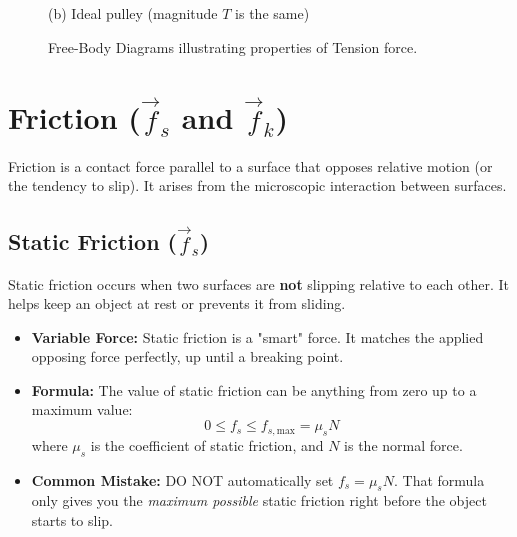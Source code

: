 \documentclass{article}
\begin{document}
\begin{figure}[h]
\begin{minipage}{0.45\textwidth}
        
        \vspace{0.2cm}
        \small (b) Ideal pulley (magnitude $T$ is the same)
    \end{minipage}
    
    \caption{Free-Body Diagrams illustrating properties of Tension force.}
\end{figure}


\newpage

\section{Friction ($\vec{f}_s$ and $\vec{f}_k$)}
Friction is a contact force parallel to a surface that opposes relative motion (or the tendency to slip). It arises from the microscopic interaction between surfaces.

\subsection{Static Friction ($\vec{f}_s$)}
Static friction occurs when two surfaces are \textbf{not} slipping relative to each other. It helps keep an object at rest or prevents it from sliding.
\begin{itemize}
    \item \textbf{Variable Force:} Static friction is a "smart" force. It matches the applied opposing force perfectly, up until a breaking point.
    \item \textbf{Formula:} The value of static friction can be anything from zero up to a maximum value:
    \begin{equation}
        0 \le f_s \le f_{s,\text{max}} = \mu_s N
    \end{equation}
    where $\mu_s$ is the coefficient of static friction, and $N$ is the normal force.
    \item \textbf{Common Mistake:} DO NOT automatically set $f_s = \mu_s N$. That formula only gives you the \emph{maximum possible} static friction right before the object starts to slip.
\end{itemize}
\end{document}

